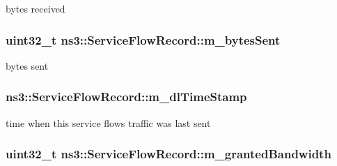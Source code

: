 bytes received 

\subsubsection[{\texorpdfstring{m\+\_\+bytes\+Sent}{m_bytesSent}}]{\setlength{\rightskip}{0pt plus 5cm}uint32\+\_\+t ns3\+::\+Service\+Flow\+Record\+::m\+\_\+bytes\+Sent\hspace{0.3cm}{\ttfamily [private]}}\hypertarget{classns3_1_1ServiceFlowRecord_acb16674f34ed488f1f03bb5138ec3bfd}{}\label{classns3_1_1ServiceFlowRecord_acb16674f34ed488f1f03bb5138ec3bfd}


bytes sent 

\subsubsection[{\texorpdfstring{m\+\_\+dl\+Time\+Stamp}{m_dlTimeStamp}}]{ ns3\+::\+Service\+Flow\+Record\+::m\+\_\+dl\+Time\+Stamp\hspace{0.3cm}{\ttfamily [private]}}\hypertarget{classns3_1_1ServiceFlowRecord_ad03ab2517099cb53abe26ffeb77f08fa}{}\label{classns3_1_1ServiceFlowRecord_ad03ab2517099cb53abe26ffeb77f08fa}


time when this service flow\textquotesingle{}s traffic was last sent 

\subsubsection[{\texorpdfstring{m\+\_\+granted\+Bandwidth}{m_grantedBandwidth}}]{\setlength{\rightskip}{0pt plus 5cm}uint32\+\_\+t ns3\+::\+Service\+Flow\+Record\+::m\+\_\+granted\+Bandwidth\hspace{0.3cm}{\ttfamily [private]}}\hypertarget{classns3_1_1ServiceFlowRecord_a9133b60b0e9c5a634cff86d2f481b979}{}\label{classns3_1_1ServiceFlowRecord_a9133b60b0e9c5a634cff86d2f481b979}


